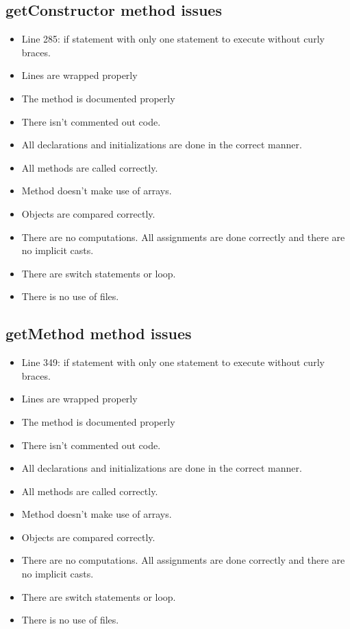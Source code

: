 \subsection{getConstructor method issues}
\begin{itemize}
	\item Line 285: if statement with only one statement to execute without curly braces.
	\item Lines are wrapped properly
	\item The method is documented properly
	\item There isn't commented out code.
	\item All declarations and initializations are done in the correct manner.
	\item All methods are called correctly.
	\item Method doesn't make use of arrays.
	\item Objects are compared correctly.
	\item There are no computations. All assignments are done correctly and there are no implicit casts.
	\item There are switch statements or loop.
	\item There is no use of files.
\end{itemize}

\subsection{getMethod method issues}
\begin{itemize}
	\item Line 349: if statement with only one statement to execute without curly braces.
	\item Lines are wrapped properly
	\item The method is documented properly
	\item There isn't commented out code.
	\item All declarations and initializations are done in the correct manner.
	\item All methods are called correctly.
	\item Method doesn't make use of arrays.
	\item Objects are compared correctly.
	\item There are no computations. All assignments are done correctly and there are no implicit casts.
	\item There are switch statements or loop.
	\item There is no use of files.
\end{itemize}

